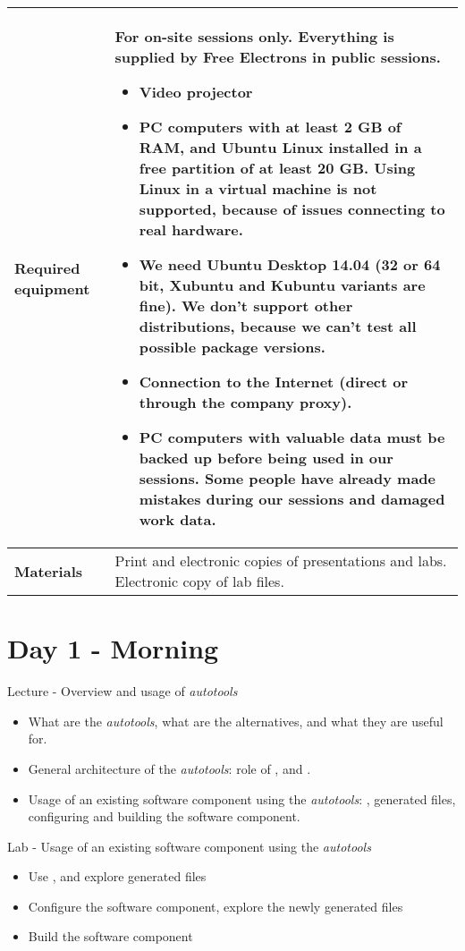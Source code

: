 \documentclass[a4paper,12pt,obeyspaces,spaces,hyphens]{article}
\begin{document}
{  \begin{tabularx}{\textwidth}{|g|h|}
    {\bf Required equipment} &
    {\bf For on-site sessions only.}
    \newline Everything is supplied by Free Electrons in public
    sessions.
    \begin{itemize}
    \item Video projector
    \item PC computers with at least 2 GB of RAM, and Ubuntu Linux
    installed in a {\bf free partition of at least 20 GB. Using Linux
      in a virtual machine is not supported}, because of issues
    connecting to real hardware.
    \item We need Ubuntu Desktop 14.04 (32 or 64 bit, Xubuntu and
    Kubuntu variants are fine). We don't support other
    distributions, because we can't test all possible package versions.
    \item {\bf Connection to the Internet} (direct or through the
    company proxy).
    \item {\bf PC computers with valuable data must be backed up}
    before being used in our sessions.  Some people have already made
    mistakes during our sessions and damaged work data.
    \end{itemize}\\
    \hline

    {\bf Materials} & Print and electronic copies of presentations and
    labs.
    \newline Electronic copy of lab files.\\
    \hline

\end{tabularx}}
\normalsize

\section{Day 1 - Morning}

\feagendatwocolumn
{Lecture - Overview and usage of {\em autotools}}
{
  \begin{itemize}
  \item What are the {\em autotools}, what are the alternatives, and
    what they are useful for.
  \item General architecture of the {\em autotools}: role of
    ,  and .
  \item Usage of an existing software component using the {\em
      autotools}: , generated files, configuring and
    building the software component.
  \end{itemize}
}
{Lab - Usage of an existing software component using the {\em autotools}}
{
  \begin{itemize}
  \item Use , and explore generated files
  \item Configure the software component, explore the newly generated
    files
  \item Build the software component
  \end{itemize}
}
\end{document}
